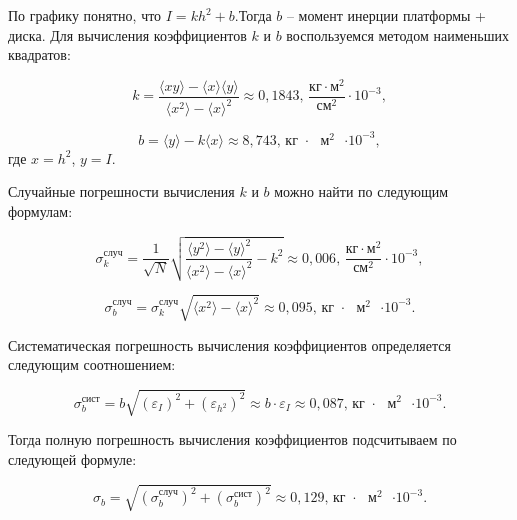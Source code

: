	По графику понятно, что $I = kh^2 + b$.Тогда $b$ -- момент инерции платформы + диска. Для вычисления коэффициентов $ k $ и $ b $ воспользуемся методом наименьших квадратов:
	
	\begin{equation}
		k=\frac{\langle xy\rangle-\langle x\rangle \langle y\rangle}{\langle x^2\rangle - \langle x\rangle^2}\approx 0,1843\text{, } \frac{\text{кг}\cdot\text{м}^2}{\text{см}^2}\cdot 10^{-3},
	\end{equation}
	
	\begin{equation}
		b=\langle y \rangle -k\langle x \rangle\approx 8,743\text{,  кг $\cdot$ $\text{м}^2$ $\cdot 10^{-3}$},
	\end{equation}
	где $ x=h^2 $, $ y=I $.
	
	Случайные погрешности вычисления $ k $ и $ b $ можно найти по следующим формулам:
	
	\begin{equation}
		\sigma_k^\text{случ}=\frac{1}{\sqrt{N}}\sqrt{\frac{\langle y^2 \rangle - \langle y \rangle^2}{\langle x^2 \rangle - \langle x \rangle^2} - k^2  } \approx 0,006 \text{, } \frac{\text{кг}\cdot\text{м}^2}{\text{см}^2}\cdot 10^{-3},
	\end{equation}
	
	\begin{equation}
		\sigma_b^\text{случ}= \sigma_k^\text{случ} \sqrt{\langle x^2 \rangle - \langle x \rangle^2} \approx 0,095 \text{,  кг $\cdot$ $\text{м}^2$ $\cdot 10^{-3}$}.
	\end{equation}
	
	Систематическая погрешность вычисления коэффициентов определяется следующим соотношением:
	
	\begin{equation}
		\sigma^\text{сист}_b = b\sqrt{\left( \varepsilon_{I} \right)^2 + \left( \varepsilon_{h^2} \right)^2 } \approx b \cdot \varepsilon_I \approx 0,087 \text{,  кг $\cdot$ $\text{м}^2$ $\cdot 10^{-3}$}.
	\end{equation}
	
	Тогда полную погрешность вычисления коэффициентов подсчитываем по следующей формуле:
	
	\begin{equation}
		\sigma_b = \sqrt{\left( \sigma_b^\text{случ} \right)^2 + \left( \sigma_b^\text{сист} \right)^2 } \approx 0,129 \text{,  кг $\cdot$ $\text{м}^2$ $\cdot 10^{-3}$}.
	\end{equation}
	
